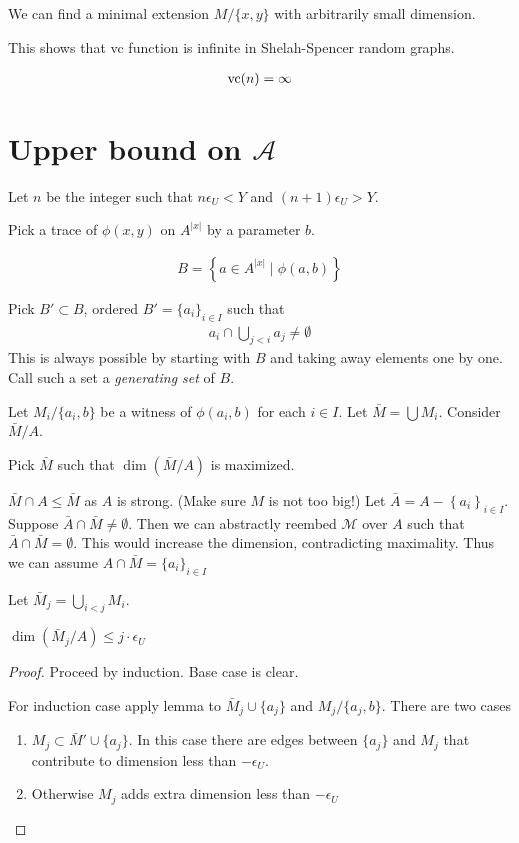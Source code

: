 \documentclass{amsart}
\renewcommand{\AA}{\mathscr A}
\newcommand{\M}{\mathcal M}
\newcommand{\curly}[1]{\left\{#1\right\}}
\begin{document}
\begin{Claim}
	We can find a minimal extension $M / \{x, y\}$ with arbitrarily small dimension.
\end{Claim}

This shows that vc function is infinite in Shelah-Spencer random graphs.

\begin{align*}
	\operatorname{vc}(n) = \infty
\end{align*}

\section{Upper bound on $\AA$}

Let $n$ be the integer such that $n \epsilon_U < Y$ and $(n+1) \epsilon_U > Y$.

Pick a trace of $\phi(x,y)$ on $A^{|x|}$ by a parameter $b$.

\begin{align*}
	B = \curly{a \in A^{|x|} \mid \phi(a, b)}
\end{align*}

Pick $B' \subset B$, ordered $B' = \{a_i\}_{i \in I}$ such that
\begin{align*}
	a_i \cap \bigcup_{j < i} a_j \neq \emptyset
\end{align*}
This is always possible by starting with $B$ and taking away elements one by one.
Call such a set a \emph{generating set} of $B$.

Let $M_i / \{a_i, b\}$ be a witness of $\phi(a_i, b)$ for each $i \in I$.
Let $\bar M = \bigcup M_i$.
Consider $\bar M / A$.

Pick $\bar M$ such that $\dim(\bar M / A)$ is maximized.

$\bar M \cap A \leq \bar M$ as $A$ is strong. (Make sure $M$ is not too big!)
Let $\bar A = A - \curly{a_i}_{i \in I}$.
Suppose $\bar A \cap \bar M \neq \emptyset$.
Then we can abstractly reembed $\M$ over $A$ such that $\bar A \cap \bar M = \emptyset$.
This would increase the dimension, contradicting maximality.
Thus we can assume $A \cap \bar M = \{a_i\}_{i \in I}$

Let $\bar M_j = \bigcup_{i < j} M_i$.

\begin{Lemma}
	$\dim(\bar M_j / A) \leq j \cdot \epsilon_U$
\end{Lemma}
\begin{proof}
	Proceed by induction.
	Base case is clear.

	For induction case apply lemma to $\bar M_j \cup \{a_j\}$ and $M_j / \{a_j, b\}$.
	There are two cases
	\begin{enumerate}
		\item $M_j \subset \bar M' \cup \{a_j\}$.
		In this case there are edges between $\{a_j\}$ and $M_j$ that contribute to dimension less than $-\epsilon_U$.
		\item Otherwise $M_j$ adds extra dimension less than $-\epsilon_U$
	\end{enumerate}
\end{proof}
\end{document}
